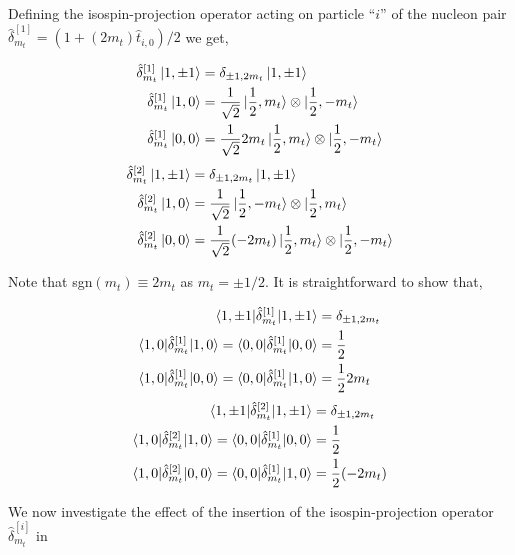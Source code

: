 \documentclass[10pt]{article}
\begin{document}
Defining the isospin-projection operator acting on particle ``$i$'' of the nucleon pair $ \hat{\delta}_{m_t}^{[1]} = ( 1 + (2 m_t) \hat{t}_{i,0})/2$ we get,
\begin{multicols}{2}
\noindent
\begin{align*}
	\hat{\delta}_{m_t}^{[1]} \ket{ 1, \pm 1} &= \delta_{\pm 1,2m_t}  \ket{ 1, \pm 1}  \\
	\hat{\delta}_{m_t}^{[1]} \ket{ 1,0} &= \frac{1}{\sqrt{2}} \ket{ \frac{1}{2}, m_t} \otimes \ket{ \frac{1}{2}, -m_t} \\
	\hat{\delta}_{m_t}^{[1]} \ket{ 0,0} &= \frac{1}{\sqrt{2}} 2 m_t \ket{ \frac{1}{2}, m_t} \otimes \ket{ \frac{1}{2}, -m_t}
\end{align*}
\begin{align*}
	\hat{\delta}_{m_t}^{[2]} \ket{ 1, \pm 1} &= \delta_{\pm 1,2m_t}  \ket{ 1, \pm 1}  \\
	\hat{\delta}_{m_t}^{[2]} \ket{ 1,0} &= \frac{1}{\sqrt{2}} \ket{ \frac{1}{2}, -m_t} \otimes \ket{ \frac{1}{2}, m_t} \\
	\hat{\delta}_{m_t}^{[2]} \ket{ 0,0} &= \frac{1}{\sqrt{2}} (-2 m_t) \ket{ \frac{1}{2}, m_t} \otimes \ket{ \frac{1}{2}, -m_t}
\end{align*}
\end{multicols}
Note that sgn$(m_t) \equiv 2m_t$ as $m_t = \pm 1/2$.
It is straightforward to show that,
\begin{multicols}{2}
\noindent
\begin{align*}
	\braket{ 1, \pm 1 | \hat{\delta}_{m_t}^{[1]} | 1, \pm 1} &= \delta_{\pm 1,2m_t}  \\
	\braket{ 1,0 | \hat{\delta}_{m_t}^{[1]} | 1,0} = \braket{ 0,0 | \hat{\delta}_{m_t}^{[1]} | 0,0} &=  \frac{1}{2} \\
	\braket{ 1,0 | \hat{\delta}_{m_t}^{[1]} | 0,0} = \braket{ 0,0 | \hat{\delta}_{m_t}^{[1]} | 1,0} &=  \frac{1}{2} 2 m_t
\end{align*}
\begin{align*}
	\braket{ 1, \pm 1 | \hat{\delta}_{m_t}^{[2]} | 1, \pm 1} &= \delta_{\pm 1,2m_t}  \\
	\braket{ 1,0 | \hat{\delta}_{m_t}^{[2]} | 1,0} = \braket{ 0,0 | \hat{\delta}_{m_t}^{[1]} | 0,0} &=  \frac{1}{2} \\
	\braket{ 1,0 | \hat{\delta}_{m_t}^{[2]} | 0,0} = \braket{ 0,0 | \hat{\delta}_{m_t}^{[1]} | 1,0} &=  \frac{1}{2} (-2 m_t) 
\end{align*}
\end{multicols}
We now investigate the effect of the insertion of the isospin-projection operator $\hat{\delta}_{m_t}^{[i]}$ in 
\end{document}
